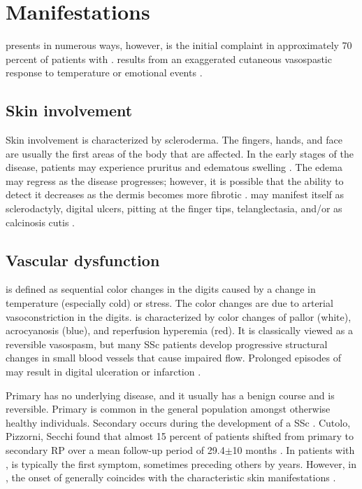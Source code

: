\section{Manifestations} \label{manifestations}

\SSc presents in numerous ways, however, \Rp is the initial complaint in
approximately 70 percent of patients with \ssc \cite[1212]{kelley}. \Rp
results from an exaggerated cutaneous vasospastic response to temperature or
emotional events \citep{fonseca}.

\subsection{Skin involvement}

Skin involvement is characterized by scleroderma. The fingers, hands, and face
are usually the first areas of the body that are affected. In the early stages
of the disease, patients may experience pruritus and edematous swelling
\citep{overviewSSc}. The edema may regress as the disease progresses; however,
it is possible that the ability to detect it decreases as the dermis becomes
more fibrotic \citep[1213]{kelley}. \SSc may manifest itself as sclerodactyly,
digital ulcers, pitting at the finger tips, telanglectasia, and/or as
calcinosis cutis \citep{overviewSSc}.

\subsection{Vascular dysfunction}

\Rp is defined as sequential color changes in the digits caused by a change in
temperature (especially cold) or stress. The color changes are due to arterial
vasoconstriction in the digits. \Rp is characterized by color changes of
pallor (white), acrocyanosis (blue), and reperfusion hyperemia (red). It is
classically viewed as a reversible vasospasm, but many SSc patients develop
progressive structural changes in small blood vessels that cause impaired
flow. Prolonged episodes of \Rp may result in digital ulceration or infarction
\citep{overviewSSc}.

Primary \Rp has no underlying disease, and it usually has a benign course and
is reversible. Primary \Rp is common in the general population amongst
otherwise healthy individuals. Secondary \Rp occurs during the development of
a SSc \citep{overviewSSc}. Cutolo, Pizzorni, Secchi found that almost 15
percent of \Rp patients shifted from primary to secondary RP over a mean
follow-up period of 29.4$\pm$10 months \citep{cutulo}. In patients with
\lcSSc, \Rp is typically the first symptom, sometimes preceding others by
years. However, in \dcSSc, the onset of \Rp generally coincides with the
characteristic skin manifestations \citep{overviewSSc}.

